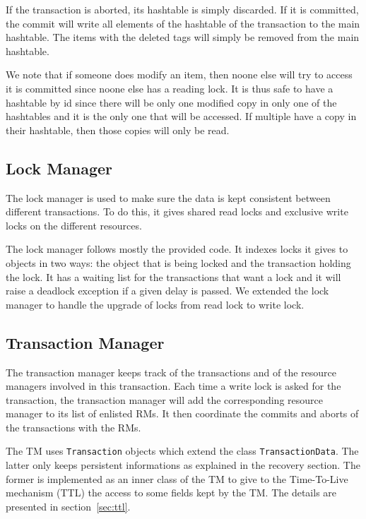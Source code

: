 \documentclass[12pt]{article}
\theoremstyle{plain}%
\theoremstyle{definition}
\theoremstyle{remark}
\newcommand{\java}[1]{{\lstinline!#1!}}
\begin{document}
If the transaction is aborted, its hashtable is simply discarded. If 
it is committed, the commit will write all elements of the hashtable 
of the transaction to the main hashtable. The items with the deleted 
tags will simply be removed from the main hashtable.

We note that if someone does modify an item, then noone else will try 
to access it is committed since noone else has a reading lock. It is 
thus safe to have a hashtable by id since there will be only one modified 
copy in only one of the hashtables and it is the only one that will be 
accessed. If multiple have a copy in their hashtable, then those copies 
will only be read.

\subsection{Lock Manager}

The lock manager is used to make sure the data is kept consistent
between different transactions. To do this, it gives shared read locks
and exclusive write locks on the different resources.

The lock manager follows mostly the provided code. It indexes locks it 
gives to objects in two ways: the object that is being locked and the 
transaction holding the lock. It has a waiting list for the transactions 
that want a lock and it will raise a deadlock exception if a given delay 
is passed. We extended the lock manager to handle the upgrade of locks 
from read lock to write lock.

\subsection{Transaction Manager}

The transaction manager keeps track of the transactions and of the 
resource managers involved in this transaction. Each time a write lock
is asked for the transaction, the transaction manager will add the
corresponding resource manager to its list of enlisted RMs. It then
coordinate the commits and aborts of the transactions with the RMs.

The TM uses \java{Transaction} objects which extend the class 
\java{TransactionData}. The latter only keeps persistent informations
as explained in the recovery section. %
The former is implemented as an inner class of the TM to give to
the Time-To-Live mechanism (TTL) the access to some fields kept by
the TM. The details are presented in section~\ref{sec:ttl}.
\end{document}
